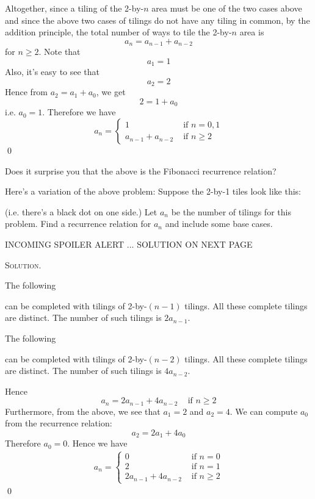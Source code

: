 Altogether, since a tiling of the 2-by-$n$ area must be one of the two cases
above and since the above two cases
of tilings do not have any tiling in common, by the addition principle,
the total number of ways to tile the 2-by-$n$ area is
\[
a_n = a_{n-1} + a_{n-2}
\]
for $n \geq 2$.
Note that
\[
a_1 = 1
\]
Also, it's easy to see that
\[
a_2 = 2
\]
Hence from $a_2 = a_1 + a_0$, we get
\[
2 = 1 + a_0
\]
i.e. $a_0 = 1$.
Therefore we have
\[
a_n =
\begin{cases}
1 & \text{ if } n = 0, 1 \\
a_{n-1} + a_{n - 2} &\text{ if } n \geq 2
\end{cases}
\]
\qed

Does it surprise you that the above is the Fibonacci recurrence relation?



\newpage
\begin{ex}
Here's a variation of the above problem:
Suppose the 2-by-1 tiles look like this:

(i.e. there's a black dot on one side.)
Let $a_n$ be the number of tilings for this problem.
Find a recurrence relation for $a_n$ and include some base cases.
\end{ex}

INCOMING SPOILER ALERT ... SOLUTION ON NEXT PAGE

\newpage
\textsc{Solution.}

The following


can be completed with tilings of 2-by-$(n-1)$ tilings.
All these complete tilings are distinct.
The number of such tilings is $2 a_{n-1}$.

The following




can be completed with tilings of 2-by-$(n-2)$ tilings.
All these complete tilings are distinct.
The number of such tilings is $4 a_{n-2}$.

Hence
\[
a_n = 2 a_{n-1} + 4 a_{n-2} \,\,\,\,\, \text{ if } n \geq 2
\]
Furthermore, from the above, we see that $a_1 = 2$ and $a_2 = 4$.
We can compute $a_0$ from the recurrence relation:
\[
a_2 = 2 a_{1} + 4 a_{0}
\]
Therefore
$a_0 = 0$.
Hence we have
\begin{align*}
  a_n =
  \begin{cases}
    0                   & \text{ if } n = 0 \\
    2                   & \text{ if } n = 1 \\
    2 a_{n-1} + 4 a_{n-2} & \text{ if } n \geq 2
  \end{cases}
\end{align*}
\qed

